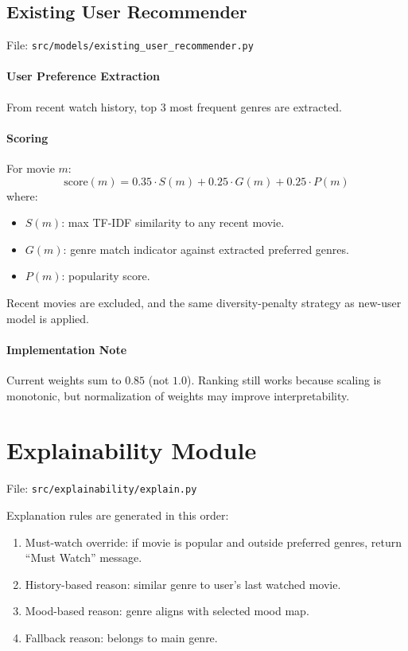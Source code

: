 \documentclass[11pt,a4paper]{article}
\begin{document}
\subsection{Existing User Recommender}
File: \texttt{src/models/existing\_user\_recommender.py}

\paragraph{User Preference Extraction}
From recent watch history, top 3 most frequent genres are extracted.

\paragraph{Scoring}
For movie $m$:
\begin{equation}
\text{score}(m)=0.35\cdot S(m)+0.25\cdot G(m)+0.25\cdot P(m)
\end{equation}
where:
\begin{itemize}[leftmargin=1.5em]
    \item $S(m)$: max TF-IDF similarity to any recent movie.
    \item $G(m)$: genre match indicator against extracted preferred genres.
    \item $P(m)$: popularity score.
\end{itemize}
Recent movies are excluded, and the same diversity-penalty strategy as new-user model is applied.

\paragraph{Implementation Note}
Current weights sum to $0.85$ (not $1.0$). Ranking still works because scaling is monotonic, but normalization of weights may improve interpretability.

\section{Explainability Module}
File: \texttt{src/explainability/explain.py}

Explanation rules are generated in this order:
\begin{enumerate}[leftmargin=1.5em]
    \item Must-watch override: if movie is popular and outside preferred genres, return ``Must Watch'' message.
    \item History-based reason: similar genre to user's last watched movie.
    \item Mood-based reason: genre aligns with selected mood map.
    \item Fallback reason: belongs to main genre.
\end{enumerate}
\end{document}
